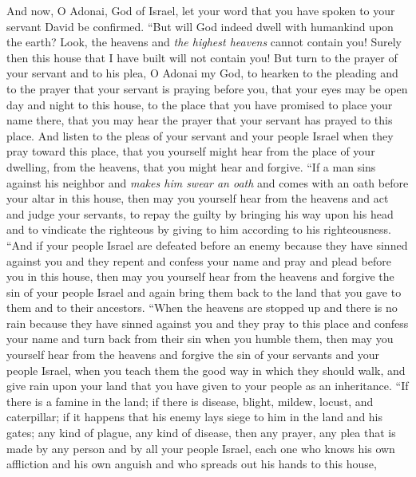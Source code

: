 \begin{biblechapter}
\verse And now, O Adonai, God of Israel, let your word that you have spoken to your servant David be confirmed.
\verse “But will God indeed dwell with humankind upon the earth? Look, the heavens and \textit{the highest heavens} cannot contain you! Surely then this house that I have built will not contain you!
\verse But turn to the prayer of your servant and to his plea, O Adonai my God, to hearken to the pleading and to the prayer that your servant is praying before you,
\verse that your eyes may be open day and night to this house, to the place that you have promised to place your name there, that you may hear the prayer that your servant has prayed to this place.
\verse And listen to the pleas of your servant and your people Israel when they pray toward this place, that you yourself might hear from the place of your dwelling, from the heavens, that you might hear and forgive.
\verse “If a man sins against his neighbor and \textit{makes him swear an oath} and comes with an oath before your altar in this house,
\verse then may you yourself hear from the heavens and act and judge your servants, to repay the guilty by bringing his way upon his head and to vindicate the righteous by giving to him according to his righteousness.
\verse “And if your people Israel are defeated before an enemy because they have sinned against you and they repent and confess your name and pray and plead before you in this house,
\verse then may you yourself hear from the heavens and forgive the sin of your people Israel and again bring them back to the land that you gave to them and to their ancestors.
\verse “When the heavens are stopped up and there is no rain because they have sinned against you and they pray to this place and confess your name and turn back from their sin when you humble them,
\verse then may you yourself hear from the heavens and forgive the sin of your servants and your people Israel, when you teach them the good way in which they should walk, and give rain upon your land that you have given to your people as an inheritance.
\verse “If there is a famine in the land; if there is disease, blight, mildew, locust, and caterpillar; if it happens that his enemy lays siege to him in the land and his gates; any kind of plague, any kind of disease,
\verse then any prayer, any plea that is made by any person and by all your people Israel, each one who knows his own affliction and his own anguish and who spreads out his hands to this house,

\end{biblechapter}
